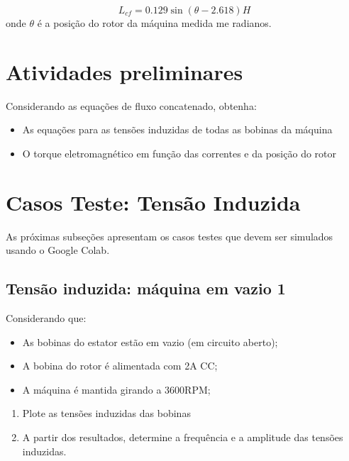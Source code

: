 \documentclass[a4paper]{article}
\theoremstyle{definition}
\theoremstyle{plain}
\begin{document}
\begin{equation}
L_{cf} = 0.129 \sin(\theta -2.618) H
\end{equation}
%
onde $\theta$ é a posição do rotor da máquina medida me radianos.

\section{Atividades preliminares}

Considerando as equações de fluxo concatenado, obtenha:

\begin{itemize}
\item As equações para as tensões induzidas de todas as bobinas da máquina
\item O torque eletromagnético em função das correntes e da posição do rotor
\end{itemize}


\section{Casos Teste: Tensão Induzida}

As próximas subseções apresentam os casos testes que devem ser simulados usando o Google Colab.



\subsection{Tensão induzida: máquina em vazio 1}

Considerando que:

\begin{itemize}
\item As bobinas do estator estão em vazio (em circuito aberto);
\item A bobina do rotor é alimentada com 2A CC;
\item A máquina é mantida girando a 3600RPM;
\end{itemize}



\begin{enumerate}
\item Plote as tensões induzidas das bobinas
\item A partir dos resultados, determine a frequência e a amplitude das tensões induzidas.
\end{enumerate}
\end{document}
